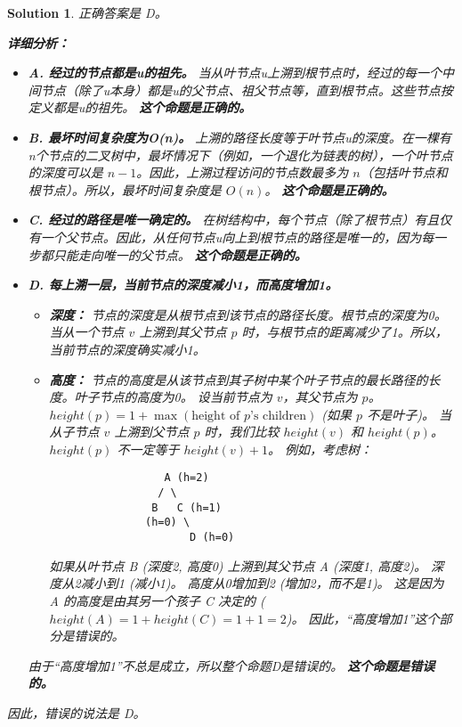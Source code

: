 \documentclass[UTF8]{report}
\newtheorem{solution}{Solution}
\theoremstyle{MyLineTheoremStyle} %
\theoremstyle{MyBlockTheoremStyle} %
\theoremstyle{MySubsubsectionStyle} %
\begin{document}
\begin{solution}
正确答案是 D。

\textbf{详细分析：}

\begin{itemize}
    \item \textbf{A. 经过的节点都是u的祖先。}
        当从叶节点u上溯到根节点时，经过的每一个中间节点（除了u本身）都是u的父节点、祖父节点等，直到根节点。这些节点按定义都是u的祖先。
        \textbf{这个命题是正确的。}

    \item \textbf{B. 最坏时间复杂度为O(n)。}
        上溯的路径长度等于叶节点u的深度。在一棵有n个节点的二叉树中，最坏情况下（例如，一个退化为链表的树），一个叶节点的深度可以是 $n-1$。因此，上溯过程访问的节点数最多为 $n$（包括叶节点和根节点）。所以，最坏时间复杂度是 $O(n)$。
        \textbf{这个命题是正确的。}

    \item \textbf{C. 经过的路径是唯一确定的。}
        在树结构中，每个节点（除了根节点）有且仅有一个父节点。因此，从任何节点u向上到根节点的路径是唯一的，因为每一步都只能走向唯一的父节点。
        \textbf{这个命题是正确的。}

    \item \textbf{D. 每上溯一层，当前节点的深度减小1，而高度增加1。}
        \begin{itemize}
            \item \textbf{深度：} 节点的深度是从根节点到该节点的路径长度。根节点的深度为0。当从一个节点 $v$ 上溯到其父节点 $p$ 时，与根节点的距离减少了1。所以，当前节点的深度确实减小1。
            \item \textbf{高度：} 节点的高度是从该节点到其子树中某个叶子节点的最长路径的长度。叶子节点的高度为0。
            设当前节点为 $v$，其父节点为 $p$。
            $height(p) = 1 + \max(\text{height of } p\text{'s children})$ (如果 $p$ 不是叶子)。
            当从子节点 $v$ 上溯到父节点 $p$ 时，我们比较 $height(v)$ 和 $height(p)$。
            $height(p)$ 不一定等于 $height(v) + 1$。
            例如，考虑树：
            \begin{verbatim}
                  A (h=2)
                 / \
                B   C (h=1)
               (h=0) \
                      D (h=0)
            \end{verbatim}
            如果从叶节点 B (深度2, 高度0) 上溯到其父节点 A (深度1, 高度2)。
            深度从2减小到1 (减小1)。
            高度从0增加到2 (增加2，而不是1)。
            这是因为 A 的高度是由其另一个孩子 C 决定的 ($height(A) = 1 + height(C) = 1+1=2$)。
            因此，“高度增加1”这个部分是错误的。
        \end{itemize}
        由于“高度增加1”不总是成立，所以整个命题D是错误的。
        \textbf{这个命题是错误的。}
\end{itemize}

因此，错误的说法是 D。
\end{solution}
\end{document}
